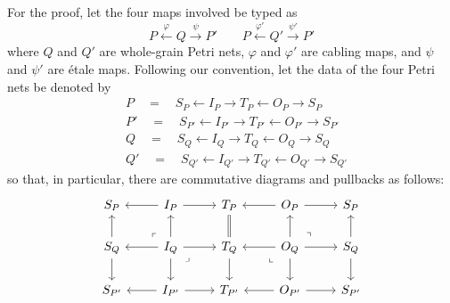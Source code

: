 \documentclass[11pt,a4paper]{article}
\theoremstyle{plain}
\theoremstyle{definition}
\theoremstyle{remark}
\begin{document}
For the proof, let the four maps involved be typed as
\[
P \xleftarrow{\varphi} Q \xrightarrow{\psi} P'  \qquad P \xleftarrow{\varphi'} Q' \xrightarrow{\psi'} P'
\]
where $Q$ and $Q'$ are whole-grain Petri nets, $\varphi$ and $\varphi'$ are cabling maps, and $\psi$ and $\psi'$ are \'etale maps. Following our convention, let the data of the four Petri nets be denoted by 
\begin{align*}
 & P\quad =\quad  S_P \leftarrow  I_P \to T_P \leftarrow  O_P \to S_P \\
& P'\quad =\quad  S_{P'} \leftarrow  I_{P'} \to T_{P'} \leftarrow  O_{P'} \to S_{P'} \\
& Q\quad =\quad  S_Q \leftarrow  I_Q \to T_Q \leftarrow  O_Q \to S_Q \\
& Q'\quad =\quad  S_{Q'} \leftarrow  I_{Q'} \to T_{Q'} \leftarrow  O_{Q'} \to S_{Q'}
\end{align*}
so that, in particular, there are commutative diagrams and pullbacks as follows:
\[\begin{tikzcd}
	{S_P} & {I_P} & {T_P} & {O_P} & {S_P} \\
	{S_Q} & {I_Q} & {T_Q} & {O_Q} & {S_Q} \\
	{S_{P'}} & {I_{P'}} & {T_{P'}} & {O_{P'}} & {S_{P'}}
	\arrow[from=1-2, to=1-1]
	\arrow[from=1-2, to=1-3]
	\arrow[from=1-4, to=1-3]
	\arrow[from=1-4, to=1-5]
	\arrow[from=2-1, to=1-1]
	\arrow[from=2-1, to=3-1]
	\arrow["\lrcorner"{anchor=center, pos=0.125, rotate=180}, draw=none, from=2-2, to=1-1]
	\arrow[from=2-2, to=1-2]
	\arrow[from=2-2, to=2-1]
	\arrow[from=2-2, to=2-3]
	\arrow[from=2-2, to=3-2]
	\arrow["\lrcorner"{anchor=center, pos=0.125}, draw=none, from=2-2, to=3-3]
	\arrow[equals, from=2-3, to=1-3]
	\arrow[from=2-3, to=3-3]
	\arrow[from=2-4, to=1-4]
	\arrow["\lrcorner"{anchor=center, pos=0.125, rotate=90}, draw=none, from=2-4, to=1-5]
	\arrow[from=2-4, to=2-3]
	\arrow[from=2-4, to=2-5]
	\arrow["\lrcorner"{anchor=center, pos=0.125, rotate=-90}, draw=none, from=2-4, to=3-3]
	\arrow[from=2-4, to=3-4]
	\arrow[from=2-5, to=1-5]
	\arrow[from=2-5, to=3-5]
	\arrow[from=3-2, to=3-1]
	\arrow[from=3-2, to=3-3]
	\arrow[from=3-4, to=3-3]
	\arrow[from=3-4, to=3-5]
\end{tikzcd}\]
\end{document}
